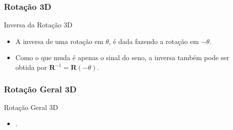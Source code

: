 \documentclass{beamer}
\begin{document}
\begin{frame}
\frametitle{Rotação 3D}

	\begin{block}{Inversa da Rotação 3D}
		\begin{itemize}
			\item A inversa de uma rotação em $\theta$, é dada fazendo a rotação em $-\theta$.
			\item Como o que muda é apenas o sinal do seno, a inversa também pode ser obtida por $\textbf{R}^{-1} = \textbf{R}(-\theta)$.
		\end{itemize}
	\end{block}
	
\end{frame}


\begin{frame}
\frametitle{Rotação Geral 3D}

	\begin{block}{Rotação Geral 3D}
		\begin{itemize}
			\item .
		\end{itemize}
	\end{block}
	
\end{frame}

\end{document}
